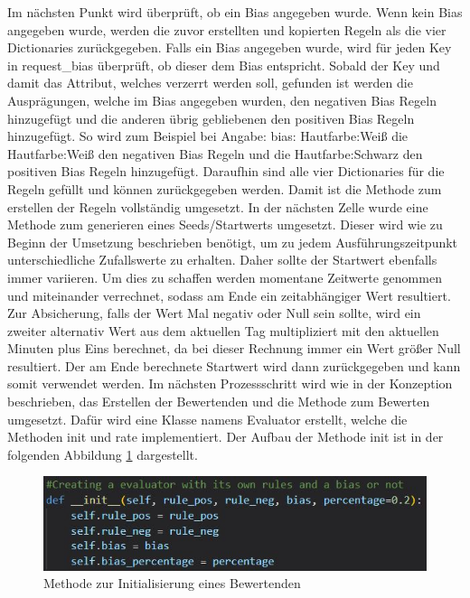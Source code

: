 \begin{onehalfspace}
Im nächsten Punkt wird überprüft, ob ein Bias angegeben wurde. Wenn kein Bias angegeben wurde, werden die zuvor erstellten und kopierten Regeln als die vier Dictionaries zurückgegeben. Falls ein Bias angegeben wurde, wird für jeden Key in \glqq{}request\_bias\grqq{} überprüft, ob dieser dem Bias entspricht. Sobald der Key und damit das Attribut, welches verzerrt werden soll, gefunden ist werden die Ausprägungen, welche im Bias angegeben wurden, den negativen Bias Regeln hinzugefügt und die anderen übrig gebliebenen den positiven Bias Regeln hinzugefügt. So wird zum Beispiel bei Angabe: \glqq{}bias: Hautfarbe:Weiß\grqq{} die Hautfarbe:Weiß den negativen Bias Regeln und die Hautfarbe:Schwarz den positiven Bias Regeln hinzugefügt. Daraufhin sind alle vier Dictionaries für die Regeln gefüllt und können zurückgegeben werden.
Damit ist die Methode zum erstellen der Regeln vollständig umgesetzt.
In der nächsten Zelle wurde eine Methode zum generieren eines Seeds/Startwerts umgesetzt. Dieser wird wie zu Beginn der Umsetzung beschrieben benötigt, um zu jedem Ausführungszeitpunkt unterschiedliche Zufallswerte zu erhalten. Daher sollte der Startwert ebenfalls immer variieren. Um dies zu schaffen werden momentane Zeitwerte genommen und miteinander verrechnet, sodass am Ende ein zeitabhängiger Wert resultiert. Zur Absicherung, falls der Wert Mal negativ oder Null sein sollte, wird ein zweiter alternativ Wert aus dem aktuellen Tag multipliziert mit den aktuellen Minuten plus Eins berechnet, da bei dieser Rechnung immer ein Wert größer Null resultiert. Der am Ende berechnete Startwert wird dann zurückgegeben und kann somit verwendet werden.    
Im nächsten Prozessschritt wird wie in der Konzeption beschrieben, das Erstellen der Bewertenden und die Methode zum Bewerten umgesetzt. Dafür wird eine Klasse namens \glqq{}Evaluator\grqq{} erstellt, welche die Methoden \glqq{}init\grqq{} und \glqq{}rate\grqq{} implementiert. Der Aufbau der Methode \glqq{}init\grqq{} ist in der folgenden Abbildung \ref{fig:Evaluator_init} dargestellt.
\begin{figure}[h]
    \centering
    \includegraphics{Diagramme/Evaluator_Init.JPG}
    \caption{Methode zur Initialisierung eines Bewertenden}
    \label{fig:Evaluator_init}

\end{figure}
\end{onehalfspace}
